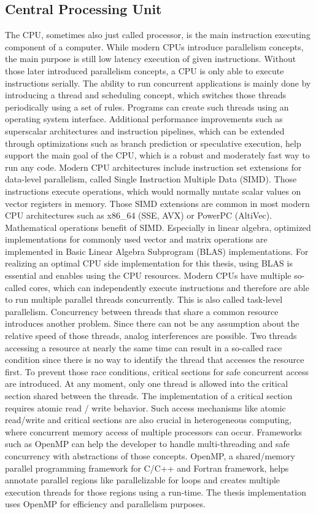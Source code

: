 \subsection{Central Processing Unit}
The CPU, sometimes also just called processor, is the main instruction executing component of a computer. While modern CPUs introduce parallelism concepts, the main purpose is still low latency execution of given instructions.
Without those later introduced parallelism concepts, a CPU is only able to execute instructions serially. The ability to run concurrent applications is mainly done by introducing a thread and scheduling concept, which switches those threads periodically using a set of rules. Programs can create such threads using an operating system interface.
Additional performance improvements such as superscalar architectures and instruction pipelines, which can be extended through optimizations such as branch prediction or speculative execution, help support the main goal of the CPU, which is a robust and moderately fast way to run any code.
Modern CPU architectures include instruction set extensions for data-level parallelism, called Single Instruction Multiple Data (SIMD). Those instructions execute operations, which would normally mutate scalar values on vector registers in memory. Those SIMD extensions are common in most modern CPU architectures such as x86\_64 (SSE, AVX) or PowerPC (AltiVec). Mathematical operations benefit of SIMD. Especially in linear algebra, optimized implementations for commonly used vector and matrix operations are implemented in Basic Linear Algebra Subprogram (BLAS) implementations. For realizing an optimal CPU side implementation for this thesis, using BLAS is essential and enables using the CPU resources.
Modern CPUs have multiple so-called cores, which can independently execute instructions and therefore are able to run multiple parallel threads concurrently. This is also called task-level parallelism.
Concurrency between threads that share a common resource introduces another problem. Since there can not be any assumption about the relative speed of those threads, analog interferences are possible. Two threads accessing a resource at nearly the same time can result in a so-called race condition since there is no way to identify the thread that accesses the resource first. To prevent those race conditions, critical sections for safe concurrent access are introduced. At any moment, only one thread is allowed into the critical section shared between the threads. The implementation of a critical section requires atomic read / write behavior.
Such access mechanisms like atomic read/write and critical sections are also crucial in heterogeneous computing, where concurrent memory access of multiple processors can occur.
Frameworks such as OpenMP can help the developer to handle multi-threading and safe concurrency with abstractions of those concepts. OpenMP, a shared/memory parallel programming framework for C/C++ and Fortran framework, helps annotate parallel regions like parallelizable for loops and creates multiple execution threads for those regions using a run-time.
The thesis implementation uses OpenMP for efficiency and parallelism purposes.

